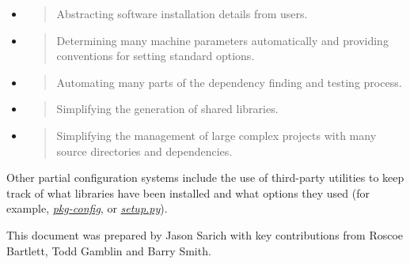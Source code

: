 \documentclass[]{article}
\begin{document}
\begin{itemize}
\item
  \begin{quote}
  Abstracting software installation details from users.
  \end{quote}
\item
  \begin{quote}
  Determining many machine parameters automatically and providing
  conventions for setting standard options.
  \end{quote}
\item
  \begin{quote}
  Automating many parts of the dependency finding and testing process.
  \end{quote}
\item
  \begin{quote}
  Simplifying the generation of shared libraries.
  \end{quote}
\item
  \begin{quote}
  Simplifying the management of large complex projects with many source
  directories and dependencies.
  \end{quote}
\end{itemize}

Other partial configuration systems include the use of third-party
utilities to keep track of what libraries have been installed and what
options they used (for example,
\href{http://www.freedesktop.org/wiki/Software/pkg-config/}{\emph{pkg-config}},
or \href{https://docs.python.org/install/}{\emph{setup.py}}).

This document was prepared by Jason Sarich with key contributions from
Roscoe Bartlett, Todd Gamblin and Barry Smith.
\end{document}

